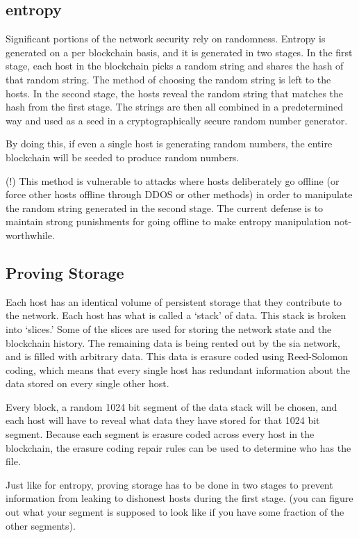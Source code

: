 \documentclass[a4paper,10pt]{article}
\begin{document}
\subsection{entropy}
\par
	Significant portions of the network security rely on randomness. 
Entropy is generated on a per blockchain basis, and it is generated in two 
stages. In the first stage, each host in the blockchain picks a random string 
and shares the hash of that random string. The method of choosing the random 
string is left to the hosts. In the second stage, the hosts reveal the random 
string that matches the hash from the first stage. The strings are then all 
combined in a predetermined way and used as a seed in a cryptographically 
secure random number generator.
\par
	By doing this, if even a single host is generating random numbers, the 
entire blockchain will be seeded to produce random numbers.
\par
	(!) This method is vulnerable to attacks where hosts deliberately go 
offline (or force other hosts offline through DDOS or other methods) in order 
to manipulate the random string generated in the second stage. The current 
defense is to maintain strong punishments for going offline to make entropy 
manipulation not-worthwhile.
\subsection{Proving Storage}
\par
	Each host has an identical volume of persistent storage that they 
contribute to the network. Each host has what is called a ‘stack’ of data. This 
stack is broken into ‘slices.’ Some of the slices are used for storing the 
network state and the blockchain history. The remaining data is being rented 
out by the sia network, and is filled with arbitrary data. This data is erasure 
coded using Reed-Solomon coding, which means that every single host has 
redundant information about the data stored on every single other host.
\par
	Every block, a random 1024 bit segment of the data stack will be 
chosen, and each host will have to reveal what data they have stored for that 
1024 bit segment. Because each segment is erasure coded across every host in 
the blockchain, the erasure coding repair rules can be used to determine who 
has the file.
\par
	Just like for entropy, proving storage has to be done in two stages to 
prevent information from leaking to dishonest hosts during the first stage. 
(you can figure out what your segment is supposed to look like if you have some 
fraction of the other segments).
\end{document}
